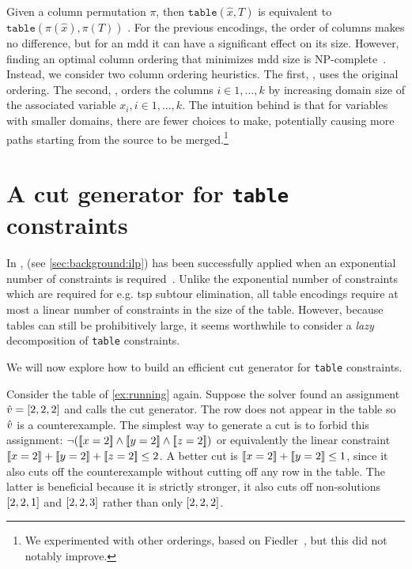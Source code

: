 \documentclass[a4paper,UKenglish,cleveref,autoref,thm-restate]{lipics-v2021}
\begin{document}
Given a column permutation $\pi$, then $\texttt{table}(\hat{x},T)$ is equivalent to $\texttt{table}(\pi(\hat{x}),\pi(T))$ .
For the previous encodings, the order of columns makes no difference, but for an \gls{mdd} it can have a significant effect on its size.
However, finding an optimal column ordering that minimizes \gls{mdd} size is NP-complete~\cite{DBLP:journals/tc/BolligW96}. 
Instead, we consider two column ordering heuristics.
The first, \baseMddInput, uses the original ordering.
The second, \baseMddDomIncr, orders the columns $i \in 1, \dots, k$ by increasing domain size of the associated variable $x_i, i \in 1, \dots, k$.
The intuition behind \baseMddDomIncr is that for variables with smaller domains, there are fewer choices to make, potentially causing more paths starting from the source to be merged.\footnote{We experimented with other orderings, \eg based on Fiedler~\cite{Fiedler1975}, but this did not notably improve.}


\section{A cut generator for \texttt{table} constraints}
\label{sec:cuts}



In \milp,  (see \cref{sec:background:ilp}) has been successfully applied when an exponential number of constraints is required~\cite{DBLP:journals/ior/Hooker07}.
Unlike the exponential number of constraints which are required for e.g. \gls{tsp} subtour elimination, all table encodings require at most a linear number of constraints in the size of the table.
However, because tables can still be prohibitively large, it seems worthwhile to consider a \emph{lazy} decomposition of \texttt{table} constraints.

We will now explore how to build an efficient cut generator for \texttt{table} constraints. 

\begin{example}
\label{ex:initial}
   Consider the table of \cref{ex:running} again.
Suppose the solver found an assignment $\hat{v} = [2,2,2]$ and calls the cut generator.
The row does not appear in the table so $\hat{v}$ is a counterexample.
The simplest way to generate a cut is to forbid this assignment: 
$\neg (\be{1}{2} \wedge \be{2}{2} \wedge \be{3}{2})$ or equivalently the linear constraint
$\be{1}{2} + \be{2}{2} + \be{3}{2} \leq 2$.
A better cut is
$\be{1}{2} + \be{2}{2} \leq 1$, since it also cuts off the counterexample without cutting off any row in the table.
The latter is beneficial because it is strictly stronger, \eg it also cuts off non-solutions $[2,2,1]$ and $[2,2,3]$ rather than only $[2,2,2]$.
\end{example}
\end{document}
